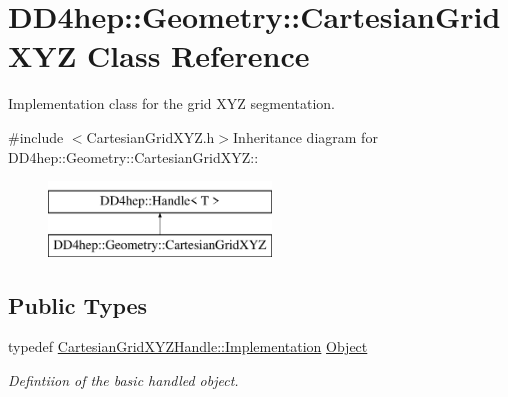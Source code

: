 \hypertarget{class_d_d4hep_1_1_geometry_1_1_cartesian_grid_x_y_z}{
\section{DD4hep::Geometry::CartesianGridXYZ Class Reference}
\label{class_d_d4hep_1_1_geometry_1_1_cartesian_grid_x_y_z}
}


Implementation class for the grid XYZ segmentation.  


{\ttfamily \#include $<$CartesianGridXYZ.h$>$}Inheritance diagram for DD4hep::Geometry::CartesianGridXYZ::\begin{figure}[H]
\begin{center}
\leavevmode
\includegraphics[height=2cm]{class_d_d4hep_1_1_geometry_1_1_cartesian_grid_x_y_z}
\end{center}
\end{figure}
\subsection*{Public Types}
\begin{DoxyCompactItemize}
\item 
typedef \hyperlink{class_t}{CartesianGridXYZHandle::Implementation} \hyperlink{class_d_d4hep_1_1_geometry_1_1_cartesian_grid_x_y_z_a14399d469a4ddf78e0df3e14276a3e4e}{Object}
\begin{DoxyCompactList}\small\item\em Defintiion of the basic handled object. \item\end{DoxyCompactList}\end{DoxyCompactItemize}
